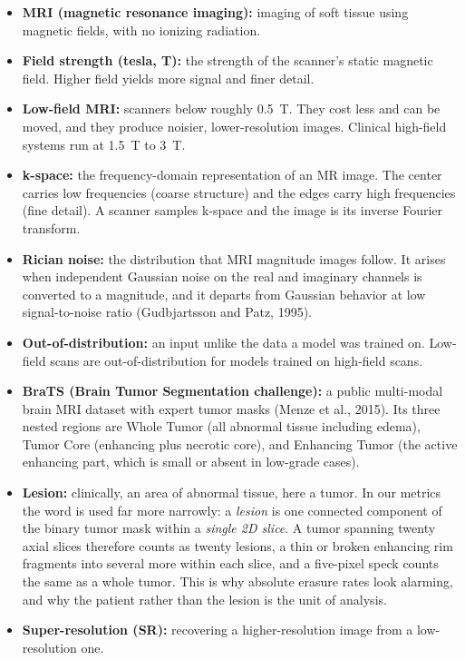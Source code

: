 \documentclass[11pt,a4paper]{article}
\begin{document}
\newcommand{\dt}[1]{\textbf{#1}}
\begin{itemize}\small
  \item \dt{MRI (magnetic resonance imaging):} imaging of soft tissue using magnetic fields, with no ionizing radiation.
  \item \dt{Field strength (tesla, T):} the strength of the scanner's static magnetic field. Higher field yields more signal and finer detail.
  \item \dt{Low-field MRI:} scanners below roughly 0.5~T. They cost less and can be moved, and they produce noisier, lower-resolution images. Clinical high-field systems run at 1.5~T to 3~T.
  \item \dt{k-space:} the frequency-domain representation of an MR image. The center carries low frequencies (coarse structure) and the edges carry high frequencies (fine detail). A scanner samples k-space and the image is its inverse Fourier transform.
  \item \dt{Rician noise:} the distribution that MRI magnitude images follow. It arises when independent Gaussian noise on the real and imaginary channels is converted to a magnitude, and it departs from Gaussian behavior at low signal-to-noise ratio (Gudbjartsson and Patz, 1995).
  \item \dt{Out-of-distribution:} an input unlike the data a model was trained on. Low-field scans are out-of-distribution for models trained on high-field scans.
  \item \dt{BraTS (Brain Tumor Segmentation challenge):} a public multi-modal brain MRI dataset with expert tumor masks (Menze et al., 2015). Its three nested regions are Whole Tumor (all abnormal tissue including edema), Tumor Core (enhancing plus necrotic core), and Enhancing Tumor (the active enhancing part, which is small or absent in low-grade cases).
  \item \dt{Lesion:} clinically, an area of abnormal tissue, here a tumor. In our metrics the word is used far more narrowly: a \emph{lesion} is one connected component of the binary tumor mask within a \emph{single 2D slice}. A tumor spanning twenty axial slices therefore counts as twenty lesions, a thin or broken enhancing rim fragments into several more within each slice, and a five-pixel speck counts the same as a whole tumor. This is why absolute erasure rates look alarming, and why the patient rather than the lesion is the unit of analysis.
  \item \dt{Super-resolution (SR):} recovering a higher-resolution image from a low-resolution one.

\end{itemize}
\end{document}
